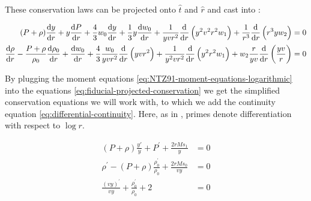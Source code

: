 \documentclass[main.tex]{subfiles}
\begin{document}
\begin{claim}

These conservation laws can be projected onto \(\hat{t}\) and \(\hat{r}\) and cast into \cite[eq. A7]{NobiliTurollaZampieri:1991dec}:

\begin{subequations} \label{eq:fiducial-projected-conservation}
\begin{align}
    (P+\rho) \dv{y}{r}
    +y \dv{P}{r}
    +\frac{4}{3} w_{0} \dv{y}{r}
    +\frac{1}{3} y \dv{w_0}{r}
    +\frac{1}{y v r^{2}} \dv{}{r}\left(y^{2} v^{2} r^{2} w_{1}\right)
    +\frac{1}{r^{3}} \dv{}{r}\left(r^{3} y w_{2}\right) &=0 \\
    \dv{\rho}{r}
    -\frac{P+\rho}{\rho_{0}}
    \dv{\rho_{0}}{r}
    +\dv{w_0}{r}
    +\frac{4}{3} \frac{w_{0}}{y v r^{2}} \dv{}{r}\left(y v r^{2}\right)
    +\frac{1}{y^{2} v r^{2}} \dv{}{r}\left(y^{2} r^{2} w_{1}\right)
    +w_{2} \frac{r}{y v} \dv{}{r}\left(\frac{y v}{r}\right) &=0
\end{align}
\end{subequations}
\end{claim}

By plugging the moment equations \eqref{eq:NTZ91-moment-equations-logarithmic} into the equations \eqref{eq:fiducial-projected-conservation} we get the simplified conservation equations we will work with, to which we add the continuity equation \eqref{eq:differential-continuity}. Here, as in \cite[]{NobiliTurollaZampieri:1991dec}, primes denote differentiation with respect to \(\log r\).

\begin{subequations}
\begin{align}
  (P + \rho) \frac{y'}{y} + P^\prime + \frac{2rM s_1}{y}  &= 0  \\
  \rho^\prime - (P + \rho) \frac{\rho_0^\prime}{\rho_0} + \frac{2rM s_0}{vy}   &=0  \\
  \frac{(vy)^\prime}{vy} + \frac{\rho_0 ^\prime}{\rho_0} + 2 &=0
\end{align}
\end{subequations}
\end{document}
